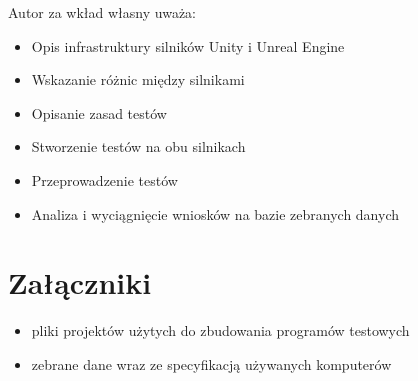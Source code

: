 \documentclass[12pt,twoside]{article}
\begin{document}
Autor za wkład własny uważa:
\begin{itemize}
\item Opis infrastruktury silników Unity i Unreal Engine
\item Wskazanie różnic między silnikami
\item Opisanie zasad testów 
\item Stworzenie testów na obu silnikach
\item Przeprowadzenie testów
\item Analiza i wyciągnięcie wniosków na bazie zebranych danych
\end{itemize}


\clearpage

\section*{Załączniki}
\begin{itemize}
    \item  pliki projektów użytych do zbudowania programów testowych
    \item zebrane dane wraz ze specyfikacją używanych komputerów
    
\end{itemize}


\clearpage

\end{document}
